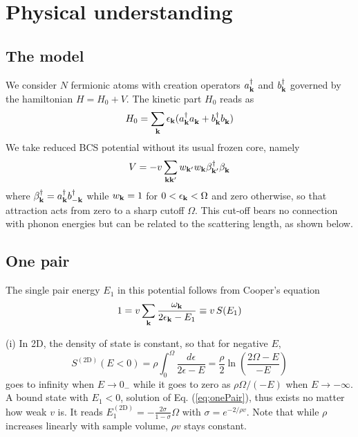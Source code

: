 \documentclass[5p,twocolumn]{elsarticle}
\begin{document}
\section{Physical understanding}
\subsection{The model\label{sec:model}}
We consider $N$ fermionic atoms with creation operators $a_{\mathbf{k}}^\dagger$ and $b_{\mathbf{k}}^\dagger$  governed by the hamiltonian
$H=H_{0}+V$. The kinetic part $H_0$ reads as 
\begin{equation}
H_0=\sum_{\mathbf{k}}\epsilon_{\mathbf{k}}(a^\dagger_{\mathbf{k}}{}a^{}_{\mathbf{k}}+b^\dagger_{\mathbf{k}}{}b^{}_{\mathbf{k}})
\label{eq:}
\end{equation}
We take reduced BCS potential without its usual frozen core, namely
\begin{equation}
V=-v\sum_{\mathbf{k}\mathbf{k}'}w_{\mathbf{k}'}w_{\mathbf{k}}\beta^\dagger_{\mathbf{k}'}{}\beta^{}_{\mathbf{k}}
\label{eq:VBcs}
\end{equation}
 where $\beta^\dagger_{\mathbf{k}}=a^\dagger_{\mathbf{k}}b^\dagger_{-\mathbf{k}}$ while $w_{\mathbf{k}}=1$ for $0<\epsilon_{\mathbf{k}}<\Omega$ and zero otherwise, so that attraction acts from zero to a sharp cutoff $\Omega$. This cut-off bears no connection with phonon energies but can be related to the scattering length, as shown below.
 \subsection{One pair\label{sec:onePair}}
The single pair energy $E_1$ in this potential follows from Cooper's equation
\begin{equation}
1=v\sum_{\mathbf{k}}\frac{\omega_{\mathbf{k}}}{2\epsilon_{\mathbf{k}}-E_1}\equiv{}v\,S(E_1)
\label{eq:onePair}
\end{equation}

(i) In 2D, the density of state is constant, so that for negative $E$, 
\begin{equation}
S^{(\text{2D})}(E<0)=\rho\int_0^{\Omega}\frac{d\epsilon}{2\epsilon-E}=\frac{\rho}{2}\ln\left(\frac{2\Omega-E}{-E}\right)
\label{eq:s1pair}
\end{equation}
goes to infinity when $E\rightarrow{}0_{-}$ while it goes to zero as $\rho\Omega/(-E)$ when $E\rightarrow-\infty$. A bound state with $E_1<0$, solution of Eq. (\ref{eq:onePair}), thus exists no matter how weak $v$ is. It reads
$
E_1^{(\text{2D})}=-\frac{2\sigma}{1-\sigma}\Omega
$
with $\sigma=e^{-2/\rho{v}}$. Note that while $\rho$ increases linearly with sample volume, $\rho{v}$ stays constant.
\end{document}
